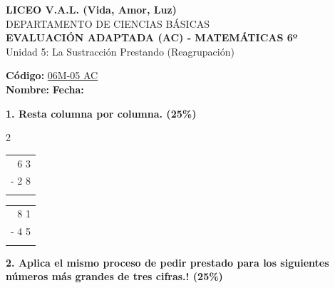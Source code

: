 \documentclass[12pt, letterpaper]{article}
\newcommand{\boxfill}[1][1.5cm]{\tcbox[on line, size=minimal, colframe=valdark!80, colback=white, boxrule=0.5pt, arc=1mm, boxsep=3pt, left=2pt, right=2pt, top=2pt, bottom=2pt]{\hspace*{#1}\vphantom{M}}}
\begin{document}
	
	\begin{center}
		{\Large \textbf{LICEO V.A.L. (Vida, Amor, Luz)}}\\[0.1cm]
		{\large DEPARTAMENTO DE CIENCIAS BÁSICAS}\\[0.1cm]
		\textbf{EVALUACIÓN ADAPTADA (AC) - MATEMÁTICAS 6º}\\[0.1cm]
		Unidad 5: La Sustracción Prestando (Reagrupación)
	\end{center}
	
	\vspace{0.3cm}
	
	\hfill \textbf{Código:} \underline{06M-05 AC}\\
	
	\noindent \textbf{Nombre:} \underline{\hspace{8cm}} \hspace{1cm}\textbf{Fecha:} \underline{\hspace{3cm}}
	
	\vspace{0.6cm}
	
	\noindent \textbf{1. Resta columna por columna. (25\%)}
	
	\vspace{0.4cm}
	\begin{multicols}{2}
		\begin{center}
			\begin{tabular}{r}
				\\[0.3cm] %
				6 3 \\
				- 2 8 \\
				\hline
				\boxfill[1.2cm]
			\end{tabular}
		\end{center}
		
		\begin{center}
			\begin{tabular}{r}
				\\[0.3cm]
				8 1 \\
				- 4 5 \\
				\hline
				\boxfill[1.2cm]
			\end{tabular}
		\end{center}

	\end{multicols}
	
	\vspace{0.6cm}
	
	\noindent \textbf{2. Aplica el mismo proceso de pedir prestado para los siguientes números más grandes de tres cifras.! (25\%)}
	
\end{document}

